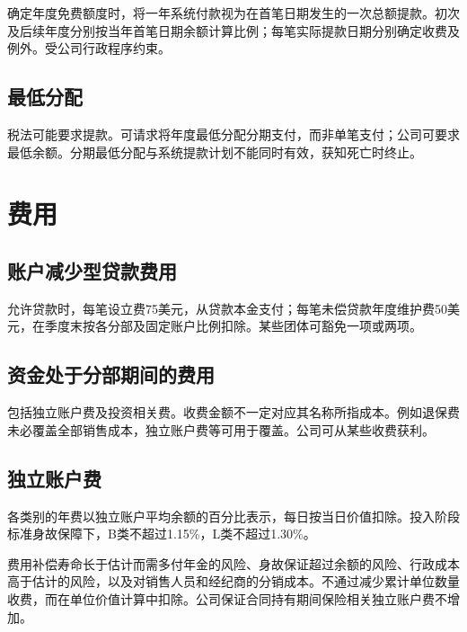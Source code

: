 \documentclass[UTF8,fontset=none,11pt,a4paper]{ctexart}
\begin{document}
确定年度免费额度时，将一年系统付款视为在首笔日期发生的一次总额提款。初次及后续年度分别按当年首笔日期余额计算比例；每笔实际提款日期分别确定收费及例外。受公司行政\allowbreak\mbox{程序约束。}


\subsection*{最低分配}
税法可能要求提款。可请求将年度最低分配分期支付，而非单笔支付；公司可要求最低余额。分期最低分配与系统提款计划不能同时有效，获知死\allowbreak\mbox{亡时终止。}


\section*{费用}
\subsection*{账户减少型贷款费用}
允许贷款时，每笔设立费75美元，从贷款本金支付；每笔未偿贷款年度维护费50美元，在季度末按各分部及固定账户比例扣除。某些团体可豁免一\allowbreak\mbox{项或两项。}


\subsection*{资金处于分部期间的费用}
包括独立账户费及投资相关费。收费金额不一定对应其名称所指成本。例如退保费未必覆盖全部销售成本，独立账户费等可用于覆盖。公司可从某些\allowbreak\mbox{收费获利。}


\subsection*{独立账户费}
各类别的年费以独立账户平均余额的百分比表示，每日按当日价值扣除。投入阶段标准身故保障下，B类不超过1.15\%，L类不超过1.30\%。


费用补偿寿命长于估计而需多付年金的风险、身故保证超过余额的风险、行政成本高于估计的风险，以及对销售人员和经纪商的分销成本。不通过减少累计单位数量收费，而在单位价值计算中扣除。公司保证合同持有期间保险相关独立账户\allowbreak\mbox{费不增加。}
\end{document}
